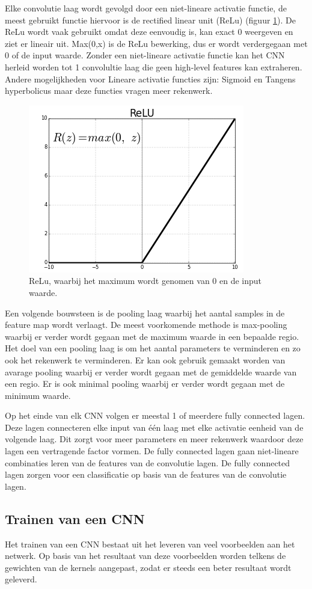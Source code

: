 Elke convolutie laag wordt gevolgd door een niet-lineare activatie functie, de meest gebruikt functie hiervoor is de rectified linear unit (ReLu) (figuur \ref{fig:relu}). 
De ReLu wordt vaak gebruikt omdat deze eenvoudig is, kan exact 0 weergeven en ziet er lineair uit. 
Max(0,x) is de ReLu bewerking, dus er wordt verdergegaan met 0 of de input waarde. 
Zonder een niet-lineare activatie functie kan het CNN herleid worden tot 1 convolultie laag die geen high-level features kan extraheren. 
Andere mogelijkheden voor Lineare activatie functies zijn: Sigmoid en Tangens hyperbolicus maar deze functies vragen meer rekenwerk.

\begin{figure}[!ht]
 	\centering
 	\includegraphics[width=0.35\linewidth]{fig/ReLu.png}
 	\caption{ReLu, waarbij het maximum wordt genomen van 0 en de input waarde.}
 	\label{fig:relu}
\end{figure}

Een volgende bouwsteen is de pooling laag waarbij het aantal samples in de feature map wordt verlaagt. 
De meest voorkomende methode is max-pooling waarbij er verder wordt gegaan met de maximum waarde in een bepaalde regio. 
Het doel van een pooling laag is om het aantal parameters te verminderen en zo ook het rekenwerk te verminderen. 
Er kan ook gebruik gemaakt worden van avarage pooling waarbij er verder wordt gegaan met de gemiddelde waarde van een regio. 
Er is ook minimal pooling waarbij er verder wordt gegaan met de minimum waarde.

Op het einde van elk CNN volgen er meestal 1 of meerdere fully connected lagen. 
Deze lagen connecteren elke input van \'e\'en laag met elke activatie eenheid van de volgende laag. 
Dit zorgt voor meer parameters en meer rekenwerk waardoor deze lagen een vertragende factor vormen. 
De fully connected lagen gaan niet-lineare combinaties leren van de features van de convolutie lagen. 
De fully connected lagen zorgen voor een classificatie op basis van de features van de convolutie lagen.

\subsection{Trainen van een CNN}
Het trainen van een CNN bestaat uit het leveren van veel voorbeelden aan het netwerk. 
Op basis van het resultaat van deze voorbeelden worden telkens de gewichten van de kernels aangepast, zodat er steeds een beter resultaat wordt geleverd. 

